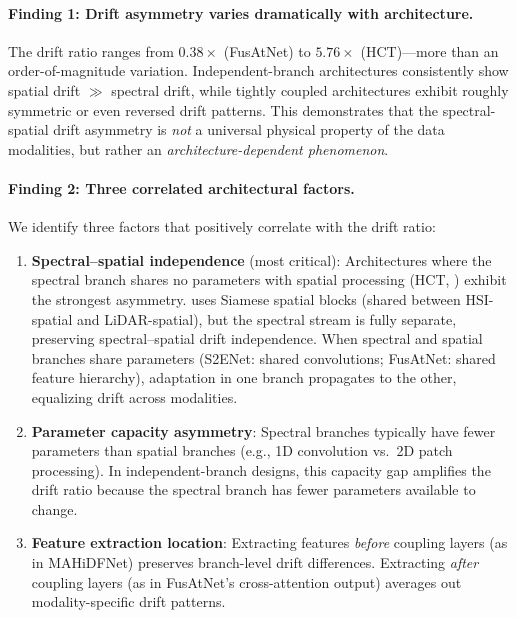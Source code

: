 \paragraph{Finding 1: Drift asymmetry varies dramatically with architecture.}
The drift ratio ranges from $0.38\times$ (FusAtNet) to $5.76\times$ (HCT)---more than an order-of-magnitude variation.
Independent-branch architectures consistently show spatial drift $\gg$ spectral drift, while tightly coupled architectures exhibit roughly symmetric or even reversed drift patterns.
This demonstrates that the spectral-spatial drift asymmetry is \emph{not} a universal physical property of the data modalities, but rather an \emph{architecture-dependent phenomenon}.

\paragraph{Finding 2: Three correlated architectural factors.}
We identify three factors that positively correlate with the drift ratio:
\begin{enumerate}
    \item \textbf{Spectral--spatial independence} (most critical): Architectures where the spectral branch shares no parameters with spatial processing (HCT, \backbonename{}) exhibit the strongest asymmetry. \backbonename{} uses Siamese spatial blocks (shared between HSI-spatial and LiDAR-spatial), but the spectral stream is fully separate, preserving spectral--spatial drift independence. When spectral and spatial branches share parameters (S2ENet: shared convolutions; FusAtNet: shared feature hierarchy), adaptation in one branch propagates to the other, equalizing drift across modalities.
    \item \textbf{Parameter capacity asymmetry}: Spectral branches typically have fewer parameters than spatial branches (e.g., 1D convolution vs.\ 2D patch processing). In independent-branch designs, this capacity gap amplifies the drift ratio because the spectral branch has fewer parameters available to change.
    \item \textbf{Feature extraction location}: Extracting features \emph{before} coupling layers (as in MAHiDFNet) preserves branch-level drift differences. Extracting \emph{after} coupling layers (as in FusAtNet's cross-attention output) averages out modality-specific drift patterns.
\end{enumerate}

